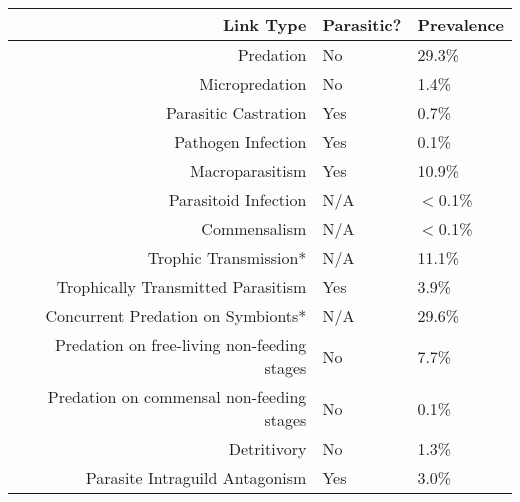 \documentclass[../dissertation.tex]{subfiles}
\begin{document}
\begin{table}
    \centering
    \begin{tabular}{r l l}
        \toprule
        Link Type                                   & Parasitic?    & Prevalence\\
        \midrule
        Predation                                   & No            &29.3\%\\%
        Micropredation                              & No            &1.4\%\\%
        Parasitic Castration                        & Yes           &0.7\%\\%
        Pathogen Infection                          & Yes           &0.1\%\\%
        Macroparasitism                             & Yes           &10.9\%\\%
        Parasitoid Infection                        & N/A           &$<$0.1\%\\%
        Commensalism                                & N/A           &$<$0.1\%\\%
        Trophic Transmission*                       & N/A           &11.1\%\\%
        Trophically Transmitted Parasitism          & Yes           &3.9\%\\%
        Concurrent Predation on Symbionts*          & N/A           &29.6\%\\%
        Predation on free-living non-feeding stages & No            &7.7\%\\%
        Predation on commensal non-feeding stages   & No            &0.1\%\\%
        Detritivory                                 & No            &1.3\%\\%
        Parasite Intraguild Antagonism              & Yes           &3.0\%\\%

\end{tabular}
\end{table}
\end{document}
